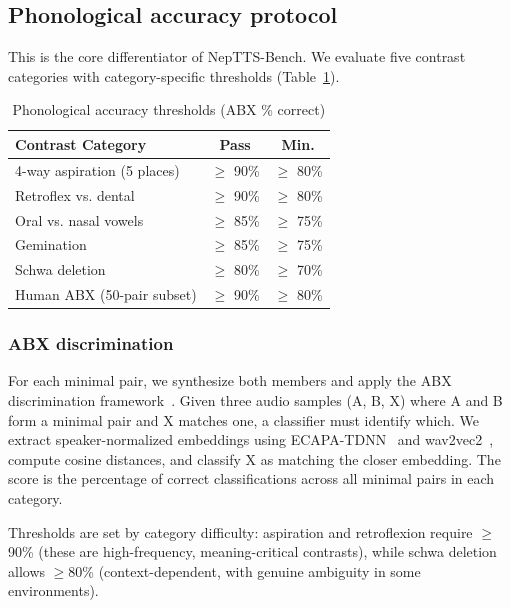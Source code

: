 \documentclass{Interspeech}
\begin{document}
\subsection{Phonological accuracy protocol}

This is the core differentiator of NepTTS-Bench. We evaluate five contrast categories with category-specific thresholds (Table~\ref{tab:phonological}).

\begin{table}[t]
  \caption{Phonological accuracy thresholds (ABX \% correct)}
  \label{tab:phonological}
  \centering
  \small
  \begin{tabular}{lcc}
    \toprule
    \textbf{Contrast Category} & \textbf{Pass} & \textbf{Min.} \\
    \midrule
    4-way aspiration (5 places) & $\geq$ 90\% & $\geq$ 80\% \\
    Retroflex vs. dental & $\geq$ 90\% & $\geq$ 80\% \\
    Oral vs. nasal vowels & $\geq$ 85\% & $\geq$ 75\% \\
    Gemination & $\geq$ 85\% & $\geq$ 75\% \\
    Schwa deletion & $\geq$ 80\% & $\geq$ 70\% \\
    \midrule
    Human ABX (50-pair subset) & $\geq$ 90\% & $\geq$ 80\% \\
    \bottomrule
  \end{tabular}
\end{table}

\subsubsection{ABX discrimination}

For each minimal pair, we synthesize both members and apply the ABX discrimination framework~\cite{Schatz2013, Schatz2016}. Given three audio samples (A, B, X) where A and B form a minimal pair and X matches one, a classifier must identify which. We extract speaker-normalized embeddings using ECAPA-TDNN~\cite{ECAPATDNN2020} and wav2vec2~\cite{XLS-R2022}, compute cosine distances, and classify X as matching the closer embedding. The score is the percentage of correct classifications across all minimal pairs in each category.

Thresholds are set by category difficulty: aspiration and retroflexion require $\geq$90\% (these are high-frequency, meaning-critical contrasts), while schwa deletion allows $\geq$80\% (context-dependent, with genuine ambiguity in some environments).
\end{document}
